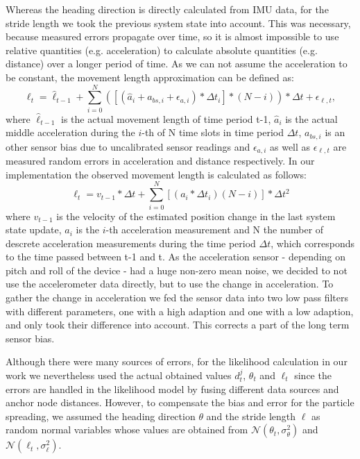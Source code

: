 Whereas the heading direction is directly calculated from IMU data, for the stride length we took the previous system state into account. This was necessary, because measured errors propagate over time, so it is almost impossible to use relative quantities (e.g. acceleration) to calculate absolute quantities (e.g. distance) over a longer period of time. As we can not assume the acceleration to be constant, the movement length approximation can be defined as: 
$$\ell_{t} = \hat{\ell}_{t-1} + \sum_{i=0}^{N}([(\hat{a}_{i} + a_{bs,i} +\epsilon_{a, i}) * \Delta t_{i} ]*(N-i)) *\Delta t + \epsilon_{\ell, t},$$
where $\hat{\ell}_{t-1}$ is the actual movement length of time period t-1, $\hat{a}_{i}$ is the actual middle acceleration during the $i$-th of N time slots in time period $\Delta t$, $a_{bs,i}$ is an other sensor bias due to uncalibrated sensor readings and $\epsilon_{a, i}$ as well as $\epsilon_{\ell, t}$ are measured random errors in acceleration and distance respectively.
In our implementation the observed movement length is calculated as follows:
$$\ell_{t} = v_{t-1} * \Delta t + \sum_{i=0}^N [(a_{i} * \Delta t_{i})(N-i)]* \Delta t^{2}$$
where $v_{t-1}$ is the velocity of the estimated position change in the last system state update, $a_{i}$ is the $i$-th acceleration measurement and N the number of descrete acceleration measurements during the time period $\Delta t$, which corresponds to the time passed between t-1 and t. As the acceleration sensor - depending on pitch and roll of the device - had a huge non-zero mean noise, we decided to not use the accelerometer data directly, but to use the change in acceleration. To gather the change in acceleration we fed the sensor data into two low pass filters with different parameters, one with a high adaption and one with a low adaption, and only took their difference into account. This corrects a part of the long term sensor bias. 

Although there were many sources of errors, for the likelihood calculation in our work we nevertheless used the actual obtained values $d^{j}_{t}$, $\theta_{t}$ and $\ell_{t}$ since the errors are handled in the likelihood model by fusing different data sources and anchor node distances. However, to compensate the bias and error for the particle spreading, we assumed the heading direction $\theta$ and the stride length $\ell$ as random normal variables whose values are obtained from $\mathcal{N}(\theta_{t}, \sigma_{\theta}^{2})$ and $\mathcal{N}(\ell_{t}, \sigma_{\ell}^{2})$.

